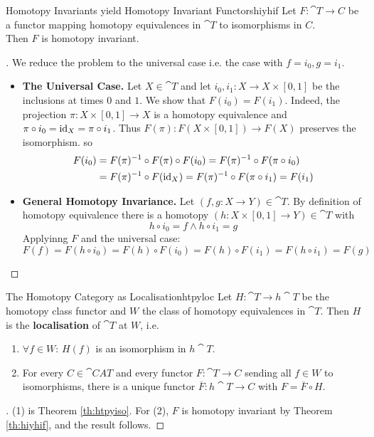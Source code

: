 \begin{theorem}{Homotopy Invariants yield Homotopy Invariant Functors}{hiyhif}
  Let $F:\cat{T}\to C$ be a functor mapping homotopy equivalences in $\cat{T}$ to isomorphisms in $C$.\\
  Then $F$ is homotopy invariant.
\end{theorem}
\begin{proof}[]
  We reduce the problem to the universal case i.e. the case with $f=i_0,g=i_1$.

  \begin{itemize}
    \item \textbf{The Universal Case.} Let $X\in\cat{T}$ and let $i_0,i_1:X\to X\times [0,1]$ be the inclusions at times $0$ and $1$. We show that $F(i_0)=F(i_1)$. Indeed, the projection $\pi:X\times [0,1]\to X$ is a homotopy equivalence and $\pi\circ i_0=\operatorname{id}_X=\pi\circ i_1$. Thus $F(\pi):F(X\times[0,1])\to F(X)$ preserves the isomorphism. so \begin{align*}
      F(i_0) &= F(\pi)^{-1} \circ F(\pi) \circ F(i_0) = F(\pi)^{-1} \circ F(\pi\circ i_0)\\
      &= F(\pi)^{-1} \circ F(\operatorname{id}_X) = F(\pi)^{-1} \circ F(\pi \circ i_1)=F(i_1)
    \end{align*}
    \item \textbf{General Homotopy Invariance.} Let $(f,g:X\to Y)\in\cat{T}$. By definition of homotopy equivalence there is a homotopy $(h:X\times[0,1]\to Y)\in\cat{T}$ with \[ h\circ i_0=f\land h\circ i_1=g \] Applyinng $F$ and the universal case: \[
      F(f)=F(h\circ i_0)=F(h)\circ F(i_0) = F(h)\circ F(i_1) = F(h\circ i_1) = F(g)
    \]
  \end{itemize}
\end{proof}

\begin{theorem}{The Homotopy Category as Localisation}{htpyloc}
  Let $H:\cat{T}\to h\cat{T}$ be the homotopy class functor and $W$ the class of homotopy equivalences in $\cat{T}$. Then $H$ is the \textbf{localisation} of $\cat{T}$ at $W$, i.e.
  \begin{enumerate}
    \item $\forall f\in W$: $H(f)$ is an isomorphism in $h\cat{T}$.
    \item For every $C\in\cat{CAT}$ and every functor $F:\cat{T}\to C$ sending all $f\in W$ to isomorphisms, there is a unique functor $\overline{F}:h\cat{T}\to C$ with $F=\overline{F}\circ H$.
  \end{enumerate}
\end{theorem}
\begin{proof}[]
  (1) is Theorem \ref{th:htpyiso}. For (2), $F$ is homotopy invariant by Theorem \ref{th:hiyhif}, and the result follows.
\end{proof}

